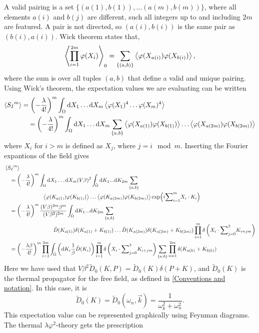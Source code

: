 A valid pairing is a set $\{(a(1), b(1)), \dots (a(m), b(m))\}$, where all elements $a(i)$ and $b(j)$ are different, such all integers up to and including $2m$ are featured.
A pair is not directed, so $(a(i), b(i))$ is the same pair as $(b(i), a(i))$.
Wick theorem states that,
\begin{equation}
    \ex{\prod_{i=1}^{2m} \varphi(X_i)  }_0
    = \sum_{\{(a, b)\}} \ex{\varphi(X_{a(i)}) \varphi(X_{b(i)})},
\end{equation}
where the sum is over all tuples $(a, b)$ that define a valid and unique pairing.
Using Wick's theorem, the expectation values we are evaluating can be written
\begin{align*}
    \ex{{S_I}^m} & 
    = \left(- \frac{\lambda }{4!}\right)^m 
    \int_{\Omega} \dd X_1 \dots \dd X_m
    \ex{\varphi(X_1)^4 \dots \varphi(X_m)^4} \\ 
    & \quad
    = \left(- \frac{\lambda }{4!}\right)^m 
    \int_{\Omega} \dd X_1 \dots \dd X_m \sum_{\{a, b\}}
    \ex{\varphi(X_{a(1)}) \varphi(X_{b(1)})} 
    \dots
    \ex{\varphi(X_{a(2m)}) \varphi(X_{b(2m)})}
\end{align*}
where $X_i$ for $i>m$ is defined as $X_j$, where $j = i \mod m$.
Inserting the Fourier expantions of the field gives
\begin{align*}
    & \ex{{S_I}^m} \\ 
    &\quad 
    = \left(-\frac{\lambda }{4!}\right)^m 
    \int_{\Omega} \dd X_1 \dots \dd X_m
    (V \beta)^2 \int_{\tilde \Omega} \dd K_1 ... \dd K_{2m} \sum_{\{a, b\}} \\
    & \quad \quad \quad \quad\quad \quad \quad
    \ex{\varphi(K_{a(1)}) \varphi(K_{b(1)})} 
    \dots
    \ex{\varphi(K_{a(2m)}) \varphi(K_{b(2m)})}     
    \exp(i {\sum}_{i=1}^{m} X_i \cdot K_i)\\ 
    & \quad  
    = \left(-\frac{\lambda }{4!}\right)^m 
    \frac{(V \beta)^{2m} \beta^m}{(V \beta^2)^{2m}}
    \int_{\tilde \Omega} \dd K_1 ... \dd K_{2m} \sum_{\{a, b\}} \\
    & \quad \quad \quad \quad \quad \quad \quad \quad \quad
    \tilde D(K_{a(1)}) \delta(K_{a(1)} + K_{b(1)}) \dots 
    \tilde D(K_{a(2m)}) \delta(K_{a(2m)} + K_{b(2m)})
    \prod_{i=1}^m \delta\left(X_i \cdot {\sum}_{j=0}^3 K_{i + jm}\right) \\
    & \quad 
    = \left(-\frac{\lambda \beta}{4!}\right)^m 
    \prod_{i=1}^{2m} \int_{\tilde \Omega} 
    \left( \dd K_i \frac{1}{\beta} \tilde D(K_i)  \right) 
    \prod_{i=1}^m \delta\left(X_i \cdot {\sum}_{j=0}^3 K_{i + jm}\right)
    \sum_{\{a, b\}} 
    \prod_{n=1}^{2m}\delta(K_{a(k)} + K_{b(k)})
\end{align*}
Here we have used that $V \beta^2 \tilde D_0(K, P) = \tilde D_0(K) \delta(P + K)$, and $\tilde D_0(K)$ is the thermal propagator for the free field, as defined in \autoref{Conventions and notation}.
In this case, it is
\begin{equation}
    \tilde D_0(K) = \tilde D_0(\omega_n, \vec k) = \frac{1}{\omega_k^2 + \omega_n^2}.
\end{equation}
This expectation value can be represented graphically using Feynman diagrams.
The thermal $\lambda \varphi^2$-theory gets the prescription

